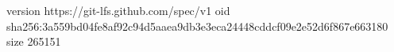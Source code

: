 version https://git-lfs.github.com/spec/v1
oid sha256:3a559bd04fe8af92c94d5aaea9db3e3eca24448cddcf09e2e52d6f867e663180
size 265151
